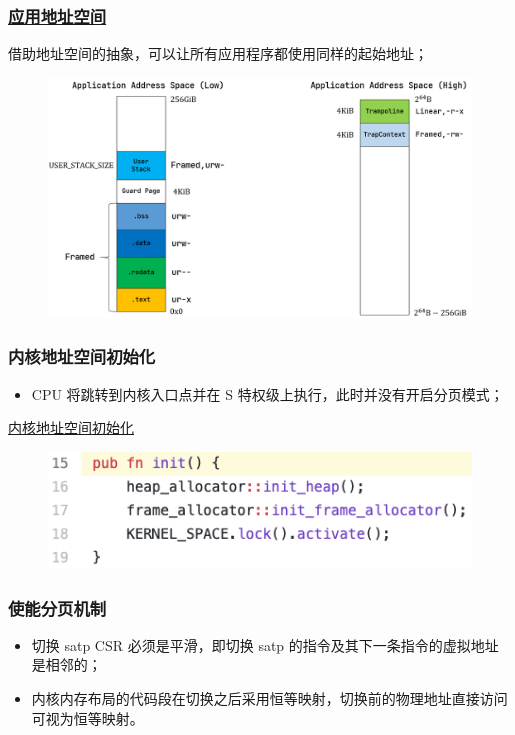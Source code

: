 \begin{frame}
    \frametitle{\href{https://rcore-os.github.io/rCore-Tutorial-Book-v3/chapter4/5kernel-app-spaces.html\#id7}{应用地址空间}}
% 
借助地址空间的抽象，可以让所有应用程序都使用同样的起始地址；
% 
    \begin{figure}
        \centering
        \includegraphics[width=0.6\linewidth]{figs/app-as-full.png}
    \end{figure}
% 
% 
% 
\end{frame}
\begin{frame}
    \frametitle{内核地址空间初始化}
% 
% 
        \begin{itemize}
        \item CPU 将跳转到内核入口点并在 S 特权级上执行，此时并没有开启分页模式；
        \end{itemize}
% 
\href{https://github.com/rcore-os/rCore-Tutorial-v3/blob/ch4/os/src/mm/mod.rs\#L15}{内核地址空间初始化}
    \begin{figure}
        \centering
        \includegraphics[width=0.6\linewidth]{figs/mod-L15.png}
    \end{figure}
% 
% 
\end{frame}
\begin{frame}
    \frametitle{使能分页机制}
% 
% 
        \begin{itemize}
        \item 切换 satp CSR 必须是平滑，即切换 satp 的指令及其下一条指令的虚拟地址是相邻的；
        \item 内核内存布局的代码段在切换之后采用恒等映射，切换前的物理地址直接访问可视为恒等映射。
        \end{itemize}
% 

% 
\end{frame}


